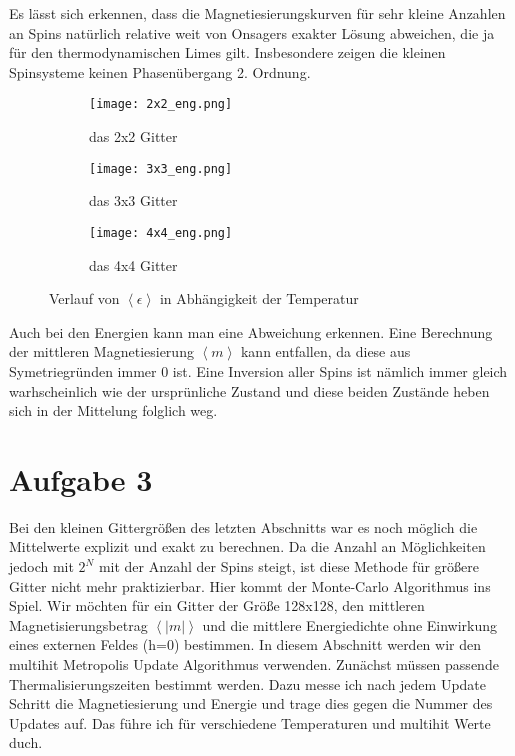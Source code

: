 \documentclass[12pt]{article}
\begin{document}
Es lässt sich erkennen, dass die Magnetiesierungskurven für sehr kleine Anzahlen an Spins natürlich relative weit von Onsagers exakter Lösung abweichen, die ja für den thermodynamischen Limes gilt. Insbesondere zeigen die kleinen Spinsysteme keinen Phasenübergang 2. Ordnung.
\begin{figure}[H]\hspace*{-1.5cm}
    \begin{subfigure}{0.4\textwidth}
    \texttt{[image: 2x2\_eng.png]}
    \caption{das 2x2 Gitter}
    \end{subfigure}
    \hfill
    \begin{subfigure}{0.4\textwidth}
    \hspace*{-0.8cm}
    \texttt{[image: 3x3\_eng.png]}
    \caption{das 3x3 Gitter}
    \end{subfigure}
    \hfill
    \hspace*{-1.5cm}
    \begin{subfigure}{0.4\textwidth}
    \texttt{[image: 4x4\_eng.png]}
    \caption{das 4x4 Gitter}
    \end{subfigure}
    \hfill
    \caption{Verlauf von $\left\langle\epsilon\right\rangle$ in Abhängigkeit der Temperatur}
    \end{figure}
Auch bei den Energien kann man eine Abweichung erkennen. Eine Berechnung der mittleren Magnetiesierung $\left\langle{m}\right\rangle$ kann entfallen, da diese aus Symetriegründen immer 0 ist. Eine Inversion aller Spins ist nämlich immer gleich warhscheinlich wie der ursprünliche Zustand und diese beiden Zustände heben sich in der Mittelung folglich weg.

\section*{Aufgabe 3}
Bei den kleinen Gittergrößen des letzten Abschnitts war es noch möglich die Mittelwerte explizit und exakt zu berechnen. Da die Anzahl an Möglichkeiten jedoch mit $2^N$ mit der Anzahl der Spins steigt, ist diese Methode für größere Gitter nicht mehr praktizierbar. Hier kommt der Monte-Carlo Algorithmus ins Spiel. Wir möchten für ein Gitter der Größe 128x128, den mittleren Magnetisierungsbetrag $ \left\langle |m|\right\rangle$ und die mittlere Energiedichte ohne Einwirkung eines externen Feldes (h=0) bestimmen. In diesem Abschnitt werden wir den multihit Metropolis Update Algorithmus verwenden. Zunächst müssen passende Thermalisierungszeiten bestimmt werden. Dazu messe ich nach jedem Update Schritt die Magnetiesierung und Energie und trage dies gegen die Nummer des Updates auf. Das führe ich für verschiedene Temperaturen und multihit Werte duch. \newline\newline
\end{document}
